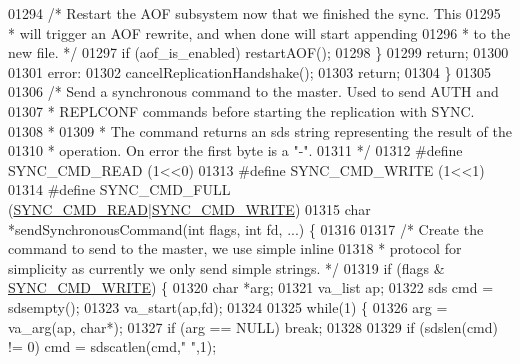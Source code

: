 \begin{DoxyCode}
{{{{{{{{{{{{{{{{{{{{{{{{{{{{{{{{{{{{{{{{{{{{{{{{01294         \textcolor{comment}{/* Restart the AOF subsystem now that we finished the sync. This}
01295 \textcolor{comment}{         * will trigger an AOF rewrite, and when done will start appending}
01296 \textcolor{comment}{         * to the new file. */}
01297         \textcolor{keywordflow}{if} (aof\_is\_enabled) restartAOF();
01298     \}
01299     \textcolor{keywordflow}{return};
01300 
01301 error:
01302     cancelReplicationHandshake();
01303     \textcolor{keywordflow}{return};
01304 \}
01305 
01306 \textcolor{comment}{/* Send a synchronous command to the master. Used to send AUTH and}
01307 \textcolor{comment}{ * REPLCONF commands before starting the replication with SYNC.}
01308 \textcolor{comment}{ *}
01309 \textcolor{comment}{ * The command returns an sds string representing the result of the}
01310 \textcolor{comment}{ * operation. On error the first byte is a "-".}
01311 \textcolor{comment}{ */}
01312 \textcolor{preprocessor}{#}\textcolor{preprocessor}{define} \textcolor{preprocessor}{SYNC\_CMD\_READ} \textcolor{preprocessor}{(}1\textcolor{preprocessor}{<<}0\textcolor{preprocessor}{)}
01313 \textcolor{preprocessor}{#}\textcolor{preprocessor}{define} \textcolor{preprocessor}{SYNC\_CMD\_WRITE} \textcolor{preprocessor}{(}1\textcolor{preprocessor}{<<}1\textcolor{preprocessor}{)}
01314 \textcolor{preprocessor}{#}\textcolor{preprocessor}{define} \textcolor{preprocessor}{SYNC\_CMD\_FULL} \textcolor{preprocessor}{(}\hyperlink{replication_8c_a5dde0948d622fc1b0327b0d49cb3cef5}{SYNC\_CMD\_READ}\textcolor{preprocessor}{|}\hyperlink{replication_8c_aa4480c458f209657b59d476157d44aab}{SYNC\_CMD\_WRITE}\textcolor{preprocessor}{)}
01315 \textcolor{keywordtype}{char} *sendSynchronousCommand(\textcolor{keywordtype}{int} flags, \textcolor{keywordtype}{int} fd, ...) \{
01316 
01317     \textcolor{comment}{/* Create the command to send to the master, we use simple inline}
01318 \textcolor{comment}{     * protocol for simplicity as currently we only send simple strings. */}
01319     \textcolor{keywordflow}{if} (flags & \hyperlink{replication_8c_aa4480c458f209657b59d476157d44aab}{SYNC\_CMD\_WRITE}) \{
01320         \textcolor{keywordtype}{char} *arg;
01321         va\_list ap;
01322         sds cmd = sdsempty();
01323         va\_start(ap,fd);
01324 
01325         \textcolor{keywordflow}{while}(1) \{
01326             arg = va\_arg(ap, \textcolor{keywordtype}{char}*);
01327             \textcolor{keywordflow}{if} (arg == NULL) \textcolor{keywordflow}{break};
01328 
01329             \textcolor{keywordflow}{if} (sdslen(cmd) != 0) cmd = sdscatlen(cmd,\textcolor{stringliteral}{" "},1);
}}}}}}}}}}}}}}}}}}}}}}}}}}}}}}}}}}}}}}}}}}}}}}}}
\end{DoxyCode}
